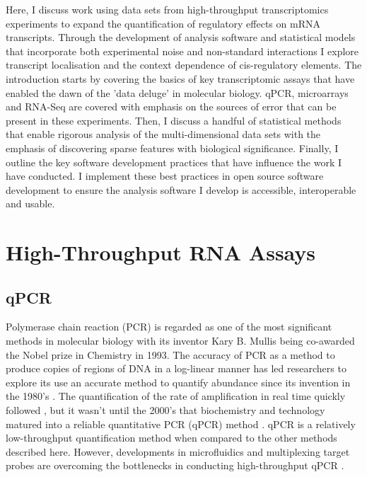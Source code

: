 \documentclass[../main.tex]{subfiles}
\begin{document}
Here, I discuss work using data sets from high-throughput transcriptomics experiments to expand the quantification of regulatory effects on mRNA transcripts. 
Through the development of analysis software and statistical models that incorporate both experimental noise and non-standard interactions I explore transcript localisation and the context dependence of cis-regulatory elements. 
The introduction starts by covering the basics of key transcriptomic assays that have enabled the dawn of the 'data deluge' in molecular biology. 
qPCR, microarrays and RNA-Seq are covered with emphasis on the sources of error that can be present in these experiments. 
Then, I discuss a handful of statistical methods that enable rigorous analysis of the multi-dimensional data sets with the emphasis of discovering sparse features with biological significance. 
Finally, I outline the key software development practices that have influence the work I have conducted. 
I implement these best practices in open source software development to ensure the analysis software I develop is accessible, interoperable and usable.

\section{High-Throughput RNA Assays}

\subsection{qPCR}

Polymerase chain reaction (PCR) is regarded as one of the most significant methods in molecular biology with its inventor Kary B. Mullis being co-awarded the Nobel prize in Chemistry in 1993.
The accuracy of PCR as a method to produce copies of regions of DNA in a log-linear manner has led researchers to explore its use an accurate method to quantify abundance since its invention in the 1980's \parencite{Saiki1988}.
The quantification of the rate of amplification in real time quickly followed \parencite{Holland1991}, but it wasn't until the 2000's that biochemistry and technology matured into a reliable quantitative PCR (qPCR) method \parencite{Walker2002}.
qPCR is a relatively low-throughput quantification method when compared to the other methods described here.
However, developments in microfluidics and multiplexing target probes are overcoming the bottlenecks in conducting high-throughput qPCR \parencite{Dreier2022}.
\end{document}
